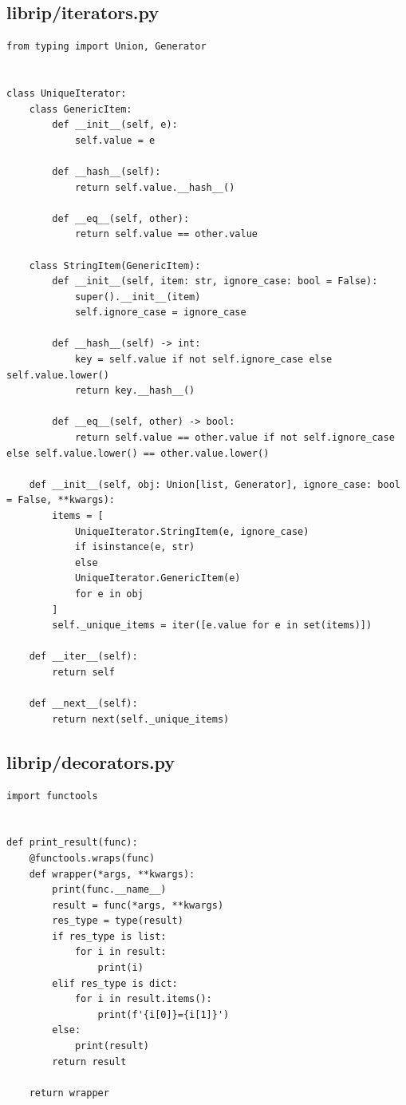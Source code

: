 \documentclass{article}
\begin{document}
\subsection{librip/iterators.py}
\begin{verbatim}
from typing import Union, Generator


class UniqueIterator:
    class GenericItem:
        def __init__(self, e):
            self.value = e
    
        def __hash__(self):
            return self.value.__hash__()

        def __eq__(self, other):
            return self.value == other.value
    
    class StringItem(GenericItem):
        def __init__(self, item: str, ignore_case: bool = False):
            super().__init__(item)
            self.ignore_case = ignore_case

        def __hash__(self) -> int:
            key = self.value if not self.ignore_case else self.value.lower()
            return key.__hash__()

        def __eq__(self, other) -> bool:
            return self.value == other.value if not self.ignore_case else self.value.lower() == other.value.lower()

    def __init__(self, obj: Union[list, Generator], ignore_case: bool = False, **kwargs):
        items = [
            UniqueIterator.StringItem(e, ignore_case)
            if isinstance(e, str)
            else
            UniqueIterator.GenericItem(e)
            for e in obj
        ]
        self._unique_items = iter([e.value for e in set(items)])

    def __iter__(self):
        return self

    def __next__(self):
        return next(self._unique_items)

\end{verbatim}

\subsection{librip/decorators.py}
\begin{verbatim}
import functools


def print_result(func):
    @functools.wraps(func)
    def wrapper(*args, **kwargs):
        print(func.__name__)
        result = func(*args, **kwargs)
        res_type = type(result)
        if res_type is list:
            for i in result:
                print(i)
        elif res_type is dict:
            for i in result.items():
                print(f'{i[0]}={i[1]}')
        else:
            print(result)
        return result

    return wrapper

\end{verbatim}
\end{document}
